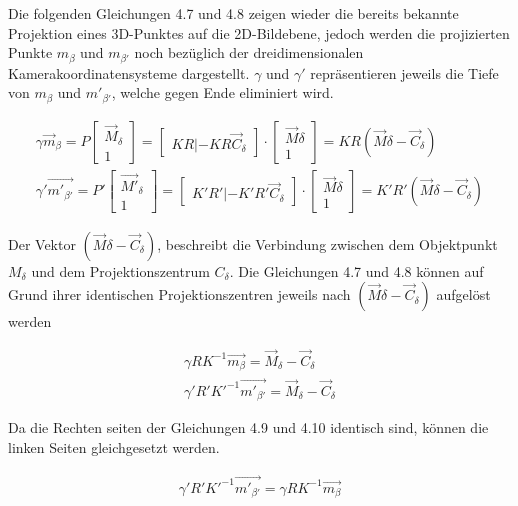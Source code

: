 Die folgenden Gleichungen 4.7 und 4.8 zeigen wieder die bereits bekannte Projektion eines 3D-Punktes auf die 2D-Bildebene, jedoch werden die projizierten Punkte $m_\beta$ und $m_{\beta'}$ noch bezüglich der dreidimensionalen Kamerakoordinatensysteme dargestellt. $\gamma$ und $\gamma'$ repräsentieren jeweils die Tiefe von $m_\beta$ und $m'_{\beta'}$, welche gegen Ende eliminiert wird\cite{Elements}.


\begin{gather}
\gamma \vec{m}_\beta = P \begin{bmatrix}\vec{M}_\delta\\1\end{bmatrix} = 
\begin{bmatrix}KR|-KR\vec{C}_\delta\end{bmatrix}\cdot \begin{bmatrix}\vec{M}\delta\\1\end{bmatrix} = KR(\vec{M}\delta - \vec{C}_\delta)\\
\gamma' \vec{m'_{\beta'}} = P' \begin{bmatrix}\vec{M'}_\delta\\1\end{bmatrix} = 
\begin{bmatrix}K'R'|-K'R'\vec{C}_\delta\end{bmatrix}\cdot \begin{bmatrix}\vec{M}\delta\\1\end{bmatrix} = K'R'(\vec{M}\delta - \vec{C}_\delta)
\end{gather}


Der Vektor $(\vec{M}\delta - \vec{C}_\delta)$, beschreibt die Verbindung zwischen dem Objektpunkt $M_\delta$  und dem Projektionszentrum $C_\delta$. Die Gleichungen 4.7 und 4.8 können auf Grund ihrer identischen Projektionszentren jeweils nach  $(\vec{M}\delta - \vec{C}_\delta)$ aufgelöst werden 

\begin{gather}
	\gamma RK^{-1}\vec{m_\beta} = \vec{M}_\delta - \vec{C}_\delta\\
	\gamma' R'K'^{-1}\vec{m'_{\beta'}} = \vec{M}_\delta - \vec{C}_\delta
\end{gather}

Da die Rechten seiten der Gleichungen 4.9 und 4.10 identisch sind, können die linken Seiten gleichgesetzt werden.

\begin{gather}
	\gamma' R'K'^{-1}\vec{m'_{\beta'}}=\gamma RK^{-1}\vec{m_\beta}\\
\end{gather}

